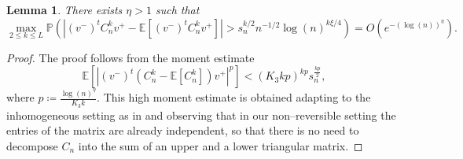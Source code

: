 \documentclass[11pt,oneside]{amsart}
\theoremstyle{plain}
\newtheorem{lemma}[theorem]{Lemma}
\numberwithin{equation}{section}
\newcommand{\E}{\mathbb{E}}
\newcommand{\p}{\mathbb{P}}
\newcommand{\centered}{C_n}
\newcommand{\x}{{{v}}^+}
\newcommand{\y}{{{v}}^-}
\newcommand{\scaling}{s_n}
\begin{document}
\begin{lemma} \label{lem:2}
    There exists $\eta > 1$ such that
\begin{equation}
    \max_{2\le k \le L} \p\left(
    \left| (\y)^t \centered^k \x - \E [(\y)^t\centered^k\x]\right| >
    \scaling^{k/2} n^{-1/2} \log(n)^{k\xi/4}
    \right)
    = O\left(e^{-(\log(n))^{\eta}}\right).
\end{equation}
\end{lemma}

\begin{proof}
    The proof follows from the moment estimate
    \begin{equation}
       \E[\left|(\y)^t \left(\centered^k - \E [\centered^k]\right)\x\right|^p]< (K_3kp)^{kp} \scaling^{\frac{kp}{2}},
    \end{equation}
    where 
    $p\coloneq\frac{\log(n)^\eta}{K_3 k}$.
    This high moment estimate is obtained adapting \cite[Lemma 6.5]{EKetal} to the inhomogeneous setting as in \cite[Lemma 4.3]{CCH} and observing that in our non--reversible setting the entries of the matrix are already independent, so that there is no need to decompose $\centered$ into the sum of an upper and a lower triangular matrix.
\end{proof}
\end{document}
